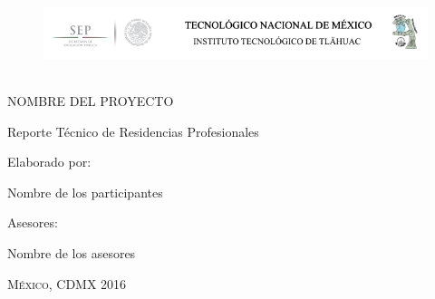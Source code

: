 \documentclass[11pt]{book}
\begin{document}
\begin{titlepage}
\begin{center}


\begin{figure}[h]
\begin{center}
\includegraphics[width=13cm, height=2.5cm]{encabezado.png}
\end{center}
\end{figure}

\vspace{2em}

NOMBRE DEL PROYECTO

\vspace{5em}

Reporte Técnico de Residencias Profesionales

\vspace{6em}

Elaborado por:

\vspace{0.5em}

Nombre de los participantes

\vspace{2em}

Asesores:

\vspace{0.5em}

Nombre de los asesores

\vspace{0.5em}





\end{center}

\vspace*{\fill}
\textsc{México, CDMX \hspace*{\fill} 2016}

\end{titlepage}


\frontmatter

\end{document}
